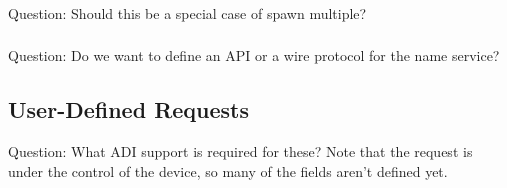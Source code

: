 \documentclass{article}
\begin{document}
\subsubsection{}

\subsubsection{}

\subsubsection{}
Question:  Should this be a special case of spawn multiple?

\subsubsection{}

\subsubsection{}
Question:  Do we want to define an API or a wire protocol for the name
service?

\subsubsection{}

\subsubsection{}

\subsubsection{}

\subsubsection{}

\subsection{User-Defined Requests}

Question:  What ADI support is required for these?  Note that the
request is under the control of the device, so many of the fields
aren't defined yet.
\end{document}
